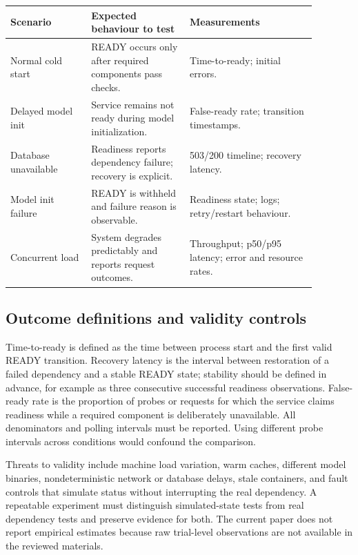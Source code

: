 \documentclass[11pt,a4paper]{article}
\begin{document}
\begin{table}[H]\centering\small

\begin{tabular}{|p{0.23\linewidth}|p{0.29\linewidth}|p{0.36\linewidth}|}\hline

\textbf{Scenario} & \textbf{Expected behaviour to test} & \textbf{Measurements}\\\hline

Normal cold start & READY occurs only after required components pass checks. & Time-to-ready; initial errors.\\\hline

Delayed model init & Service remains not ready during model initialization. & False-ready rate; transition timestamps.\\\hline

Database unavailable & Readiness reports dependency failure; recovery is explicit. & 503/200 timeline; recovery latency.\\\hline

Model init failure & READY is withheld and failure reason is observable. & Readiness state; logs; retry/restart behaviour.\\\hline

Concurrent load & System degrades predictably and reports request outcomes. & Throughput; p50/p95 latency; error and resource rates.\\\hline

\end{tabular}\end{table}

\subsection{Outcome definitions and validity controls}

Time-to-ready is defined as the time between process start and the first valid READY transition. Recovery latency is the interval between restoration of a failed dependency and a stable READY state; stability should be defined in advance, for example as three consecutive successful readiness observations. False-ready rate is the proportion of probes or requests for which the service claims readiness while a required component is deliberately unavailable. All denominators and polling intervals must be reported. Using different probe intervals across conditions would confound the comparison.

Threats to validity include machine load variation, warm caches, different model binaries, nondeterministic network or database delays, stale containers, and fault controls that simulate status without interrupting the real dependency. A repeatable experiment must distinguish simulated-state tests from real dependency tests and preserve evidence for both. The current paper does not report empirical estimates because raw trial-level observations are not available in the reviewed materials.
\end{document}
